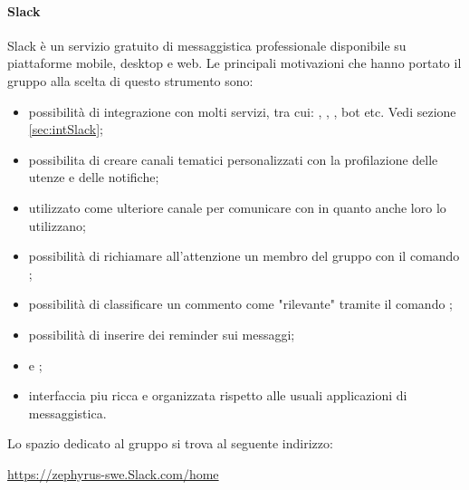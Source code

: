 		\paragraph{Slack}
		\label{sec:Slack}
		Slack è un servizio gratuito  di messaggistica professionale disponibile su piattaforme mobile, desktop e web. Le principali motivazioni che hanno portato il gruppo alla scelta di questo strumento sono:
		\begin{itemize}
			\item possibilità di integrazione con molti servizi, tra cui: , , , bot etc. Vedi sezione \ref{sec:intSlack};
			\item possibilita di creare canali tematici personalizzati con la profilazione delle utenze e delle notifiche;
			\item utilizzato come ulteriore canale per comunicare con \riskapp{} in quanto anche loro lo utilizzano;
			\item possibilità di richiamare all'attenzione un membro del gruppo con il comando ;
			\item possibilità di classificare  un commento  come "rilevante" tramite il comando ;
			\item possibilità di inserire dei reminder sui messaggi;
			\item {} e ;
			\item interfaccia piu ricca e organizzata rispetto alle usuali applicazioni di messaggistica.
		\end{itemize}
		Lo spazio dedicato al gruppo si trova al seguente indirizzo:
		\begin{center}
			\url{https://zephyrus-swe.Slack.com/home}
		\end{center}
